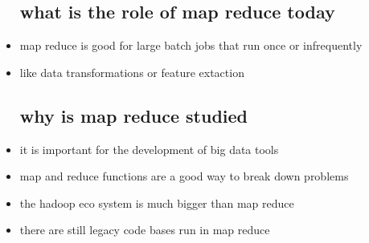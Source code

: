 \documentclass{article}
\begin{document}
\begin{itemize}
\subsection*{what is the role of map reduce today}
\item map reduce is good for large batch jobs that run once or infrequently 
\item like data transformations or feature extaction 
\subsection*{why is map reduce studied}
\item it is important for the development of big data tools 
\item map and reduce functions are a good way to break down problems 
\item the hadoop eco system is much bigger than map reduce 
\item there are still legacy code bases run in map reduce 
\end{itemize}
\end{document}
